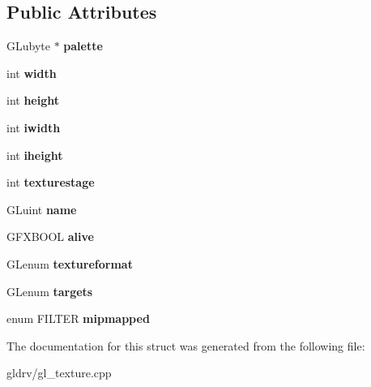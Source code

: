\subsection*{Public Attributes}
\begin{DoxyCompactItemize}
\item 
G\+Lubyte $\ast$ {\bfseries palette}\hypertarget{structGLTexture_abc6d9a450100b93b5955e6482aeaec67}{}\label{structGLTexture_abc6d9a450100b93b5955e6482aeaec67}

\item 
int {\bfseries width}\hypertarget{structGLTexture_adb5580a8773468c2286a48a2c6f465e2}{}\label{structGLTexture_adb5580a8773468c2286a48a2c6f465e2}

\item 
int {\bfseries height}\hypertarget{structGLTexture_af4a24bae76d7af470602942f3c207c32}{}\label{structGLTexture_af4a24bae76d7af470602942f3c207c32}

\item 
int {\bfseries iwidth}\hypertarget{structGLTexture_a4117ae4a39fe0cf94813da3c55c160cd}{}\label{structGLTexture_a4117ae4a39fe0cf94813da3c55c160cd}

\item 
int {\bfseries iheight}\hypertarget{structGLTexture_ad2187d5695b9327a4f7db5e152d6bf4c}{}\label{structGLTexture_ad2187d5695b9327a4f7db5e152d6bf4c}

\item 
int {\bfseries texturestage}\hypertarget{structGLTexture_a03bf927131e0ad6a1595e34a915b38a6}{}\label{structGLTexture_a03bf927131e0ad6a1595e34a915b38a6}

\item 
G\+Luint {\bfseries name}\hypertarget{structGLTexture_a8ad8173c8a56ce14ed158a85e0d4e179}{}\label{structGLTexture_a8ad8173c8a56ce14ed158a85e0d4e179}

\item 
G\+F\+X\+B\+O\+OL {\bfseries alive}\hypertarget{structGLTexture_ab0100ffc74cf1441ca8fa5dfe4dc49e7}{}\label{structGLTexture_ab0100ffc74cf1441ca8fa5dfe4dc49e7}

\item 
G\+Lenum {\bfseries textureformat}\hypertarget{structGLTexture_a15ce585e885d45a3cb843eb2aa47efad}{}\label{structGLTexture_a15ce585e885d45a3cb843eb2aa47efad}

\item 
G\+Lenum {\bfseries targets}\hypertarget{structGLTexture_acf3aba832360144efe4515b026cad9bf}{}\label{structGLTexture_acf3aba832360144efe4515b026cad9bf}

\item 
enum F\+I\+L\+T\+ER {\bfseries mipmapped}\hypertarget{structGLTexture_ac483f17edd53736a83f736c20fb0681d}{}\label{structGLTexture_ac483f17edd53736a83f736c20fb0681d}

\end{DoxyCompactItemize}


The documentation for this struct was generated from the following file\+:\begin{DoxyCompactItemize}
\item 
gldrv/gl\+\_\+texture.\+cpp\end{DoxyCompactItemize}
